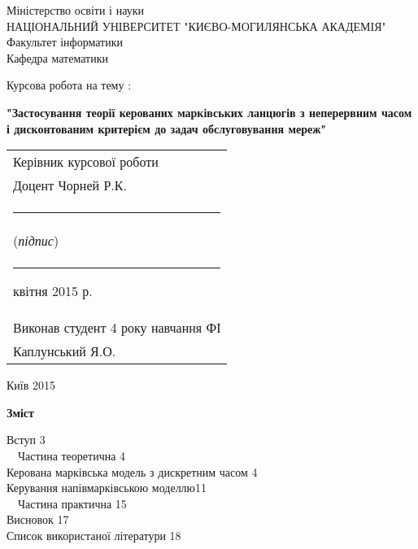\documentclass[a4paper, 14pt]{extarticle}
\date{\vspace{-5ex}}
\author{Ярослав Каплунський}
\begin{document}
\thispagestyle{empty}
\begin{center}
	Міністерство освіти і науки\\ НАЦІОНАЛЬНИЙ УНІВЕРСИТЕТ "КИЄВО-МОГИЛЯНСЬКА АКАДЕМІЯ"
	\\Факультет інформатики
	\\Кафедра математики
\end{center}
		
		
		\vspace{35mm}
		\begin{center}
			Курсова робота на тему :
		\end{center}


\begin{Large}
	\begin{center}
		\textbf{
			"Застосування теорії керованих марківських ланцюгів з неперервним 						часом і дисконтованим критерієм до задач обслуговування мереж"
		}
	\end{center}
		
\end{Large}

\vspace{35mm}


\begin{flushright}
	\begin{tabular}{@{}l@{}}
		Керівник курсової роботи \\
		Доцент Чорней Р.К.\\
		
		\noindent\rule{4cm}{0.4pt}\\
		(\textit{підпис})\\
		\noindent\rule{1cm}{0.4pt} квітня 2015 р.\\
		Виконав студент 4 року навчання ФІ\\
		Каплунський Я.О.\\
	
	\end{tabular}
\end{flushright}

\vfill

\begin{center}
Київ 2015
\end{center}

\newpage
\begin{center}
	{\Large \textbf{Зміст}}
\end{center}



\noindent Вступ \hfill 3\\
 \ \  Частина теоретична \hfill 4\\
 Керована марківська модель з дискретним часом \hfill 4\\
 Керування напівмарківською моделлю\hfill 11\\
  \ \ Частина практична \hfill 15\\
\noindent   Висновок \hfill 17\\
\noindent Список використаної літератури \hfill 18\\
\end{document}
